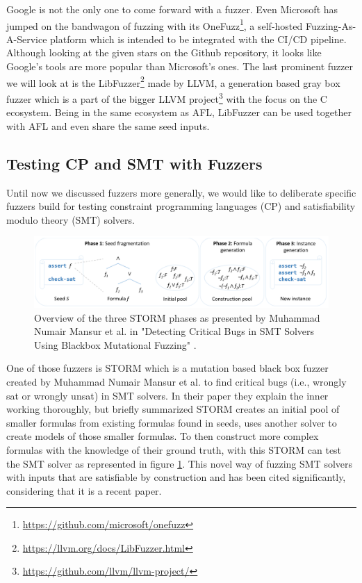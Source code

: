 Google is not the only one to come forward with a fuzzer. Even Microsoft has jumped on the bandwagon of fuzzing with its OneFuzz\footnote{\url{https://github.com/microsoft/onefuzz}}, a self-hosted Fuzzing-As-A-Service platform which is intended to be integrated with the CI/CD pipeline. Although looking at the given stars on the Github repository, it looks like Google's tools are more popular than Microsoft's ones. The last prominent fuzzer we will look at is the LibFuzzer\footnote{\url{https://llvm.org/docs/LibFuzzer.html}} made by LLVM, a generation based gray box fuzzer which is a part of the bigger LLVM project\footnote{\url{https://github.com/llvm/llvm-project/}} with the focus on the C ecosystem. Being in the same ecosystem as AFL, LibFuzzer can be used together with AFL and even share the same seed inputs.

\subsection{Testing CP and SMT with Fuzzers}
Until now we discussed fuzzers more generally, we would like to deliberate specific fuzzers build for testing constraint programming languages (CP) and satisfiability modulo theory (SMT) solvers.
\begin{figure}
	\centering
	\includegraphics[width=1.0\textwidth]{images/STORM}
	\caption{Overview of the three STORM phases as presented by Muhammad Numair Mansur et al. in "Detecting Critical Bugs in SMT Solvers Using Blackbox Mutational Fuzzing" \cite{1mansur2020detecting}.}
	\label{fig:STORM}
\end{figure}
One of those fuzzers is STORM which is a mutation based black box fuzzer created by Muhammad Numair Mansur et al. \cite{1mansur2020detecting} to find critical bugs (i.e., wrongly sat or wrongly unsat) in SMT solvers. In their paper \cite{1mansur2020detecting} they explain the inner working thoroughly, but briefly summarized STORM creates an initial pool of smaller formulas from existing formulas found in seeds, uses another solver to create models of those smaller formulas. To then construct more complex formulas with the knowledge of their ground truth, with this STORM can test the SMT solver as represented in figure \ref{fig:STORM}. This novel way of fuzzing SMT solvers with inputs that are satisfiable by construction and has been cited significantly, considering that it is a recent paper.


